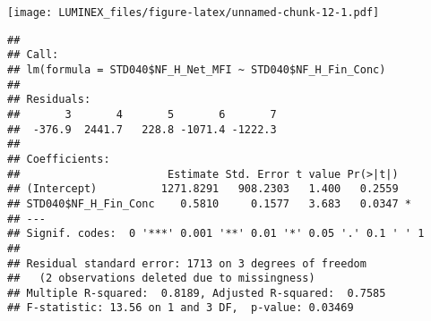 \documentclass[]{article}
\newenvironment{Shaded}{\begin{snugshade}}{\end{snugshade}}
\newcommand{\CommentTok}[1]{\textcolor[rgb]{0.56,0.35,0.01}{\textit{#1}}}
\newcommand{\FloatTok}[1]{\textcolor[rgb]{0.00,0.00,0.81}{#1}}
\newcommand{\KeywordTok}[1]{\textcolor[rgb]{0.13,0.29,0.53}{\textbf{#1}}}
\newcommand{\NormalTok}[1]{#1}
\newcommand{\OperatorTok}[1]{\textcolor[rgb]{0.81,0.36,0.00}{\textbf{#1}}}
\newcommand{\StringTok}[1]{\textcolor[rgb]{0.31,0.60,0.02}{#1}}
\begin{document}
\texttt{[image: LUMINEX\_files/figure-latex/unnamed-chunk-12-1.pdf]}

\begin{Shaded}
\end{Shaded}

\begin{Shaded}
\end{Shaded}

\begin{verbatim}
## 
## Call:
## lm(formula = STD040$NF_H_Net_MFI ~ STD040$NF_H_Fin_Conc)
## 
## Residuals:
##       3       4       5       6       7 
##  -376.9  2441.7   228.8 -1071.4 -1222.3 
## 
## Coefficients:
##                       Estimate Std. Error t value Pr(>|t|)  
## (Intercept)          1271.8291   908.2303   1.400   0.2559  
## STD040$NF_H_Fin_Conc    0.5810     0.1577   3.683   0.0347 *
## ---
## Signif. codes:  0 '***' 0.001 '**' 0.01 '*' 0.05 '.' 0.1 ' ' 1
## 
## Residual standard error: 1713 on 3 degrees of freedom
##   (2 observations deleted due to missingness)
## Multiple R-squared:  0.8189, Adjusted R-squared:  0.7585 
## F-statistic: 13.56 on 1 and 3 DF,  p-value: 0.03469
\end{verbatim}
\end{document}
